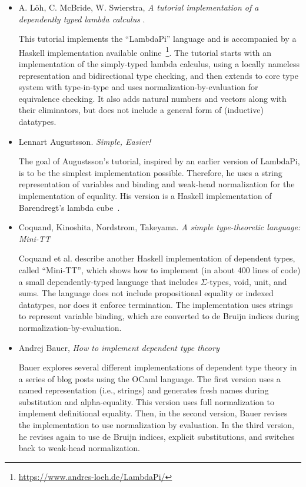 \documentclass{article}
\theoremstyle{definition}
\begin{document}
\begin{itemize}

\item A. Löh, C. McBride, W. Swierstra, %
  \emph{A tutorial implementation of a dependently typed lambda calculus}    \cite{loeh:tutorial}.

  This tutorial implements the ``LambdaPi'' language and is accompanied by a
  Haskell implementation available
  online~\footnote{\url{https://www.andres-loeh.de/LambdaPi/}}. The tutorial
  starts with an implementation of the simply-typed lambda calculus, using a
  locally nameless representation and bidirectional type checking, and then
  extends to core type system with type-in-type and uses
  normalization-by-evaluation for equivalence checking. It also adds natural
  numbers and vectors along with their eliminators, but does not include a
  general form of (inductive) datatypes.

\item Lennart Augustsson. \emph{Simple, Easier!} \cite{augustsson:tutorial}

  The goal of Augustsson's tutorial, inspired by an earlier version of
  LambdaPi, is to be the simplest implementation possible. Therefore, he uses
  a string representation of variables and binding and weak-head normalization
  for the implementation of equality. His version is a Haskell implementation of
  Barendregt's lambda cube~\cite{barendregt:lambda-calculi-with-types}.

\item Coquand, Kinoshita, Nordstrom, Takeyama. \emph{A simple type-theoretic
    language: Mini-TT} \cite{coquand:tutorial}

  Coquand et al. describe another Haskell implementation of dependent types,
  called ``Mini-TT'', which shows how to implement (in about 400 lines of code)
  a small dependently-typed language that includes $\Sigma$-types, void, unit,
  and sums.  The language does not include propositional equality or indexed
  datatypes, nor does it enforce termination.  The implementation uses strings
  to represent variable binding, which are converted to de Bruijn indices
  during normalization-by-evaluation.

\item Andrej Bauer, \emph{How to implement dependent type theory} \cite{bauer:tutorial}

  Bauer explores several different implementations of dependent type theory in
  a series of blog posts using the OCaml language. The first version uses a
  named representation (i.e., strings) and generates fresh names during
  substitution and alpha-equality. This version uses full normalization to
  implement definitional equality. Then, in the second version, Bauer revises
  the implementation to use normalization by evaluation. In the third version,
  he revises again to use de Bruijn indices, explicit substitutions, and
  switches back to weak-head normalization.


\end{itemize}
\end{document}
